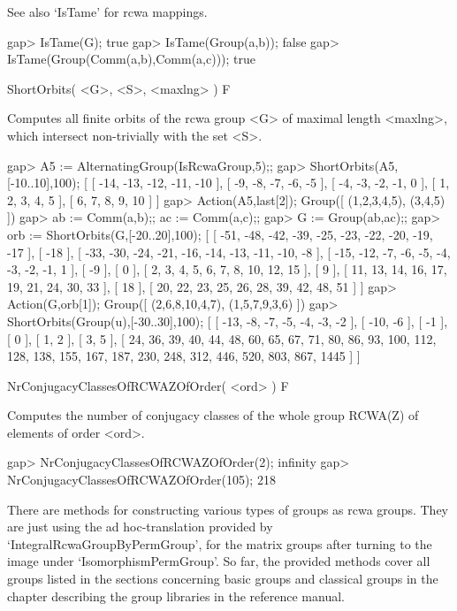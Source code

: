 See also `IsTame' for rcwa mappings.

\beginexample
gap> IsTame(G);
true
gap> IsTame(Group(a,b));
false
gap> IsTame(Group(Comm(a,b),Comm(a,c)));
true
\endexample

\>ShortOrbits( <G>, <S>, <maxlng> ) F

Computes all finite orbits of the rcwa group <G> of maximal length
<maxlng>, which intersect non-trivially with the set <S>.

\beginexample
gap> A5 := AlternatingGroup(IsRcwaGroup,5);;
gap> ShortOrbits(A5,[-10..10],100);
[ [ -14, -13, -12, -11, -10 ], [ -9, -8, -7, -6, -5 ], [ -4, -3, -2, -1, 0 ], 
  [ 1, 2, 3, 4, 5 ], [ 6, 7, 8, 9, 10 ] ]
gap> Action(A5,last[2]);
Group([ (1,2,3,4,5), (3,4,5) ])
gap> ab := Comm(a,b);; ac := Comm(a,c);;
gap> G := Group(ab,ac);;
gap> orb := ShortOrbits(G,[-20..20],100);
[ [ -51, -48, -42, -39, -25, -23, -22, -20, -19, -17 ], [ -18 ], 
  [ -33, -30, -24, -21, -16, -14, -13, -11, -10, -8 ], 
  [ -15, -12, -7, -6, -5, -4, -3, -2, -1, 1 ], [ -9 ], [ 0 ], 
  [ 2, 3, 4, 5, 6, 7, 8, 10, 12, 15 ], [ 9 ], 
  [ 11, 13, 14, 16, 17, 19, 21, 24, 30, 33 ], [ 18 ], 
  [ 20, 22, 23, 25, 26, 28, 39, 42, 48, 51 ] ]
gap> Action(G,orb[1]);
Group([ (2,6,8,10,4,7), (1,5,7,9,3,6) ])
gap> ShortOrbits(Group(u),[-30..30],100);
[ [ -13, -8, -7, -5, -4, -3, -2 ], [ -10, -6 ], [ -1 ], [ 0 ], [ 1, 2 ], 
  [ 3, 5 ], [ 24, 36, 39, 40, 44, 48, 60, 65, 67, 71, 80, 86, 93, 100, 112, 
      128, 138, 155, 167, 187, 230, 248, 312, 446, 520, 803, 867, 1445 ] ]
\endexample


\>NrConjugacyClassesOfRCWAZOfOrder( <ord> ) F

Computes the number of conjugacy classes of the whole group RCWA(Z) of
elements of order <ord>.

\beginexample
gap> NrConjugacyClassesOfRCWAZOfOrder(2);
infinity
gap> NrConjugacyClassesOfRCWAZOfOrder(105);
218
\endexample


There are methods for constructing various types of groups as rcwa
groups. They are just using the ad hoc-translation provided by 
`IntegralRcwaGroupByPermGroup', for the matrix groups after turning to
the image under `IsomorphismPermGroup'. So far, the provided methods
cover all groups listed in the sections concerning basic groups and
classical groups in the chapter describing the group libraries in the
reference manual.

